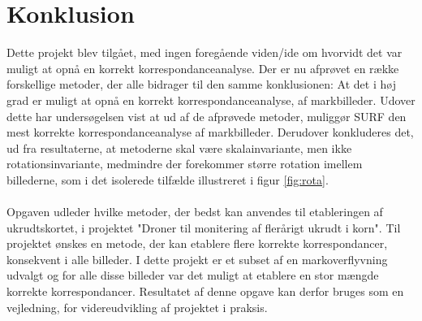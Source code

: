 \chapter{Konklusion}
Dette projekt blev tilgået, med ingen foregående viden/ide om hvorvidt det var muligt at opnå en korrekt korrespondanceanalyse. Der er nu afprøvet en række forskellige metoder, der alle bidrager til den samme konklusionen: At det i høj grad er muligt at opnå en korrekt korrespondanceanalyse, af markbilleder. Udover dette har undersøgelsen vist at ud af de afprøvede metoder, muliggør SURF den mest korrekte korrespondanceanalyse af markbilleder. 
Derudover konkluderes det, ud fra resultaterne, at metoderne skal være skalainvariante, men ikke rotationsinvariante, medmindre der forekommer større rotation imellem billederne, som i det isolerede tilfælde illustreret i figur \ref{fig:rota}.  \\ \\
Opgaven udleder hvilke metoder, der bedst kan anvendes til etableringen af ukrudtskortet, i projektet "Droner til monitering af flerårigt ukrudt i korn". Til projektet ønskes en metode, der kan etablere flere korrekte korrespondancer, konsekvent i alle billeder. I dette projekt er et subset af en markoverflyvning udvalgt og for alle disse billeder var det muligt at etablere en stor mængde korrekte korrespondancer. Resultatet af denne opgave kan derfor bruges som en vejledning, for videreudvikling af projektet i praksis. 